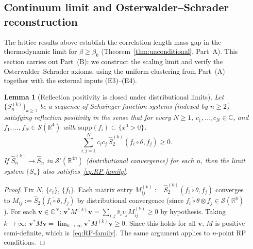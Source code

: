 \documentclass[11pt]{article}
\newtheorem{lemma}[theorem]{Lemma}
\theoremstyle{definition}
\newcommand{\R}{\mathbb{R}}
\begin{document}
\subsection{Continuum limit and Osterwalder--Schrader reconstruction}%
\label{sec:ost}

The lattice results above establish the correlation-length mass gap
in the thermodynamic limit for $\beta\ge\beta_0$
(Theorem~\ref{thm:unconditional}, Part~A).  This section
carries out Part~(B): we construct the scaling limit and verify
the Osterwalder--Schrader axioms, using the uniform clustering
from Part~(A) together with the external inputs (E3)--(E4).

\begin{lemma}[Reflection positivity is closed under
distributional limits]\label{lem:RP-closed}
Let $\{S_n^{(k)}\}_{k\ge 1}$ be a sequence of
Schwinger function systems (indexed by $n\ge 2$) satisfying
reflection positivity in the sense that for every $N\ge 1$,
$c_1,\ldots,c_N\in\mathbb{C}$, and
$f_1,\ldots,f_N\in\mathcal{S}(\R^4)$ with
$\mathrm{supp}(f_i)\subset\{x^0>0\}$:
\begin{equation}\label{eq:RP-family}
\sum_{i,j=1}^N\bar c_i c_j\,
\hat S_2^{(k)}(\overline{f_i\circ\theta},f_j)\ge 0.
\end{equation}
If $\hat S_n^{(k)}\to\hat S_n$ in $\mathcal{S}'(\R^{4n})$
(distributional convergence) for each $n$, then the limit
system $\{S_n\}$ also satisfies~\eqref{eq:RP-family}.
\end{lemma}

\begin{proof}
Fix $N$, $\{c_i\}$, $\{f_i\}$.  Each matrix entry
$M_{ij}^{(k)}:=\hat S_2^{(k)}(\overline{f_i\circ\theta},f_j)$
converges to $M_{ij}:=\hat S_2(\overline{f_i\circ\theta},f_j)$
by distributional convergence (since
$\overline{f_i\circ\theta}\otimes f_j\in\mathcal{S}(\R^8)$).
For each $\mathbf{v}\in\mathbb{C}^N$:
$\mathbf{v}^*M^{(k)}\mathbf{v}
=\sum_{i,j}\bar v_i v_j M_{ij}^{(k)}\ge 0$
by hypothesis.  Taking $k\to\infty$:
$\mathbf{v}^*M\mathbf{v}
=\lim_{k\to\infty}\mathbf{v}^*M^{(k)}\mathbf{v}\ge 0$.
Since this holds for all $\mathbf{v}$, $M$ is positive
semi-definite, which is~\eqref{eq:RP-family}.
The same argument applies to $n$-point RP conditions.
\end{proof}
\end{document}
